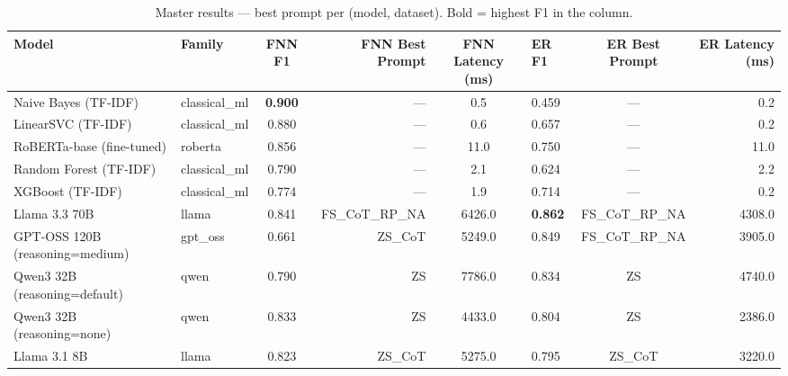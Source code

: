 \begin{table}
\caption{Master results — best prompt per (model, dataset). Bold = highest F1 in the column.}
\label{tab:master}
\begin{tabular}{llcrclcr}
\toprule
Model & Family & FNN F1 & FNN Best Prompt & FNN Latency (ms) & ER F1 & ER Best Prompt & ER Latency (ms) \\
\midrule
Naive Bayes (TF-IDF) & classical_ml & \textbf{0.900} & — & 0.5 & 0.459 & — & 0.2 \\
LinearSVC (TF-IDF) & classical_ml & 0.880 & — & 0.6 & 0.657 & — & 0.2 \\
RoBERTa-base (fine-tuned) & roberta & 0.856 & — & 11.0 & 0.750 & — & 11.0 \\
Random Forest (TF-IDF) & classical_ml & 0.790 & — & 2.1 & 0.624 & — & 2.2 \\
XGBoost (TF-IDF) & classical_ml & 0.774 & — & 1.9 & 0.714 & — & 0.2 \\
Llama 3.3 70B & llama & 0.841 & FS_CoT_RP_NA & 6426.0 & \textbf{0.862} & FS_CoT_RP_NA & 4308.0 \\
GPT-OSS 120B (reasoning=medium) & gpt_oss & 0.661 & ZS_CoT & 5249.0 & 0.849 & FS_CoT_RP_NA & 3905.0 \\
Qwen3 32B (reasoning=default) & qwen & 0.790 & ZS & 7786.0 & 0.834 & ZS & 4740.0 \\
Qwen3 32B (reasoning=none) & qwen & 0.833 & ZS & 4433.0 & 0.804 & ZS & 2386.0 \\
Llama 3.1 8B & llama & 0.823 & ZS_CoT & 5275.0 & 0.795 & ZS_CoT & 3220.0 \\
\bottomrule
\end{tabular}
\end{table}